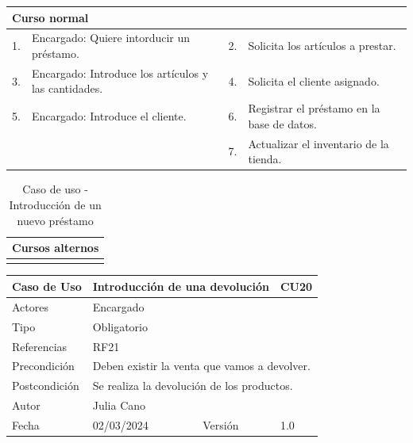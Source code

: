 \begin{table}[H]
	\centering
	\begin{tabular}{| m{} | m{} | m{} | m{} |}
		\hline
		\multicolumn{4}{|m{0.9\textwidth}|}{Curso normal}     \\ 
		\hline
		1. & Encargado: Quiere intorducir un préstamo. & 2. &  Solicita los artículos a prestar.  \\ 
		\hline
		3. & Encargado: Introduce los artículos y las cantidades. & 4. &  Solicita el cliente asignado.  \\ 
		\hline
		5. & Encargado: Introduce el cliente. & 6. & Registrar el préstamo en la base de datos.  \\ 
		\hline
		&  & 7. &  Actualizar el inventario de la tienda.  \\ 
		\hline
	\end{tabular}
\end{table}

\begin{table}[H]
	\centering
	\begin{tabular}{| m{} | m{} | m{} | m{} |}
		\hline
		\multicolumn{4}{|m{0.9\textwidth}|}{Cursos alternos}     \\ 
		\hline
		 & \multicolumn{3}{m{0.67\textwidth}|}{} \\ 
		\hline
	\end{tabular}
	\caption{Caso de uso - Introducción de un nuevo préstamo}
\end{table}

\newpage


\begin{table}[H]
	\centering
	\begin{tabular}{| m{} | m{} | m{} | m{}|}
		\hline
		\rowcolor{grayshade} Caso de Uso & \multicolumn{2}{|m{0.43\textwidth}|}{Introducción de una devolución} &  CU20\\ 
		\hline
		Actores & \multicolumn{3}{l|}{Encargado} \\ 
		\hline
		Tipo & \multicolumn{3}{l|}{Obligatorio} \\ 
		\hline
		Referencias & \multicolumn{3}{l|}{RF21} \\ 
		\hline
		Precondición & \multicolumn{3}{m{0.67\textwidth}|}{Deben existir la venta que vamos a devolver.} \\ 
		\hline
		Postcondición & \multicolumn{3}{m{0.67\textwidth}|}{Se realiza la devolución de los productos.} \\ 
		\hline
		Autor & \multicolumn{3}{l|}{Julia Cano} \\ 
		\hline
		Fecha & 02/03/2024 & Versión & 1.0 \\
		\hline
	\end{tabular}
\end{table}

